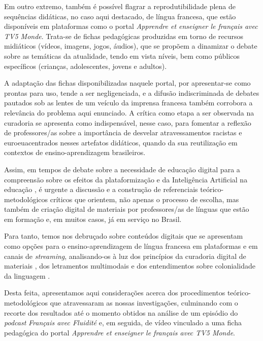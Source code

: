 \documentclass[portuguese]{textolivre}
\begin{document}
Em outro extremo, também é possível flagrar a reprodutibilidade plena de sequências didáticas, no caso aqui destacado, de língua francesa, que estão disponíveis em plataformas como o portal \textit{Apprendre et enseigner le français avec TV5 Monde}. Trata-se de fichas pedagógicas produzidas em torno de recursos midiáticos (vídeos, imagens, jogos, áudios), que se propõem a dinamizar o debate sobre as temáticas da atualidade, tendo em vista níveis, bem como públicos específicos (crianças, adolescentes, jovens e adultos).

A adaptação das fichas disponibilizadas naquele portal, por apresentar-se como prontas para uso, tende a ser negligenciada, e a difusão indiscriminada de debates pautados sob as lentes de um veículo da imprensa francesa também corrobora a relevância do problema aqui enunciado. A crítica como etapa a ser observada na curadoria se apresenta como indispensável, nesse caso, para fomentar a reflexão de professores/as sobre a importância de desvelar atravessamentos racistas e euroeuacentrados \cite{kleiman_agenda_2013} nesses artefatos didáticos, quando da sua reutilização em contextos de ensino-aprendizagem brasileiros.

Assim, em tempos de debate sobre a necessidade de educação digital para a compreensão sobre os efeitos da plataformização e da Inteligência Artificial na educação \cite{tzirides_generative_2023}, é urgente a discussão e a construção de referenciais teórico-metodológicos críticos que orientem, não apenas o processo de escolha, mas também de criação digital de materiais por professores/as de línguas que estão em formação e, em muitos casos, já em serviço no Brasil.

Para tanto, temos nos debruçado sobre conteúdos digitais que se apresentam como opções para o ensino-aprendizagem de língua francesa em plataformas e em canais de \textit{streaming}, analisando-os à luz dos princípios da curadoria digital de materiais \cite{deschaine_five_2015}, dos letramentos multimodais \cite{kalantzis_letramentos_2020} e dos entendimentos sobre colonialidade da linguagem \cite{veronelli_sobre_2021}. 

Desta feita, apresentamos aqui considerações acerca dos procedimentos teórico-metodológicos que atravessaram as nossas investigações, culminando com o recorte dos resultados até o momento obtidos na análise de um episódio do \textit{podcast} \textit{Français avec Fluidité} e, em seguida, de vídeo vinculado a uma ficha pedagógica do portal \textit{Apprendre et enseigner le français avec TV5 Monde}. 
\end{document}

